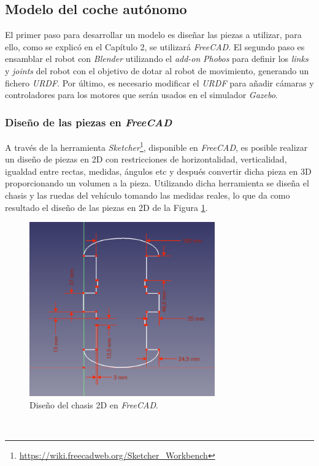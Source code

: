 \subsection{Modelo del coche autónomo}
\label{subsection:vehiclemodel}
El primer paso para desarrollar un modelo es diseñar las piezas a utilizar, para ello, como se explicó en el Capítulo 2, se utilizará \textit{FreeCAD}. El segundo paso es
ensamblar el robot con \textit{Blender} utilizando el \textit{add-on} \textit{Phobos} para definir los \textit{links} y \textit{joints} del robot con el objetivo de dotar al robot
de movimiento, generando un fichero \textit{URDF}. Por último, es necesario modificar el \textit{URDF} para añadir cámaras y controladores para los motores que serán usados en el
simulador \textit{Gazebo}.\\

\subsubsection{Diseño de las piezas en \textit{FreeCAD}}

A través de la herramienta \textit{Sketcher}\footnote{\url{https://wiki.freecadweb.org/Sketcher_Workbench}}, disponible en \textit{FreeCAD}, es posible realizar un diseño de
piezas en 2D con restricciones de horizontalidad, verticalidad, igualdad entre rectas, medidas, ángulos etc y después convertir dicha pieza en 3D proporcionando un volumen a la
pieza. Utilizando dicha herramienta se diseña el chasis y las ruedas del vehículo tomando las medidas reales, lo que da como resultado el diseño de las piezas en 2D de la Figura
\ref{fig:design2Dfreecad}.\\

\begin{figure} [h!]
	\begin{center}
		\includegraphics[width=8cm]{figs/sketchFreecad}
	\end{center}
	\caption{Diseño del chasis 2D en \textit{FreeCAD}.}
	\label{fig:design2Dfreecad}
\end{figure}\

